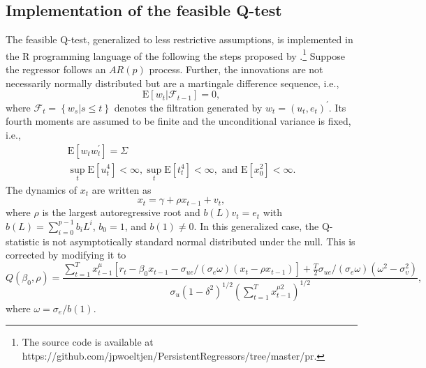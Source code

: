 \documentclass{article}
\begin{document}
\subsection{Implementation of the feasible Q-test}
\label{implementation}

The feasible Q-test, generalized to less restrictive assumptions, is implemented in the R programming language of the \citet{R} following the steps proposed by \citet{campbell2005implementing}.\footnote{The source code is available at https://github.com/jpwoeltjen/PersistentRegressors/tree/master/pr.} Suppose the regressor follows an $AR(p)$ process. Further, the innovations are not necessarily normally distributed but are a martingale difference sequence, i.e., 
\begin{equation}
\mathrm{E}\left[w_{t} |\mathscr{F}_{t-1}\right]=0,
\end{equation}
where $\mathscr{F}_{t}=\left\{w_{s} | s \leq t\right\}$ denotes the filtration generated by $w_{t}=\left(u_{t}, e_{t}\right)^{\prime}$.
Its fourth moments are assumed to be finite and the unconditional variance is fixed, i.e.,
\begin{equation}
\label{eqn:covarst}
\begin{array}{l}{\mathrm{E}\left[w_{t} w_{t}^{\prime}\right]=\Sigma} \\ {\sup _{t} \mathrm{E}\left[u_{t}^{4}\right]<\infty, \sup _{t} \mathrm{E}\left[t_{t}^{4}\right]<\infty, \text { and } \mathrm{E}\left[x_{0}^{2}\right]<\infty.}\end{array}
\end{equation}
The dynamics of $x_{t}$ are written as
\begin{equation}
\label{eqn:22}
x_{t}=\gamma+\rho x_{t-1}+v_{t},
\end{equation}
where $\rho$ is the largest autoregressive root and $b(L) v_{t}=e_{t}$ with $b(L)=\sum_{i=0}^{p-1} b_{i} L^{i}$, $b_{0}=1$, and $b(1) \neq 0$. In this generalized case, the Q-statistic is not asymptotically standard normal distributed under the null. This is corrected by modifying it to
\begin{equation}
Q\left(\beta_{0}, \rho\right)=\frac{\sum_{t=1}^{T} x_{t-1}^{\mu}\left[r_{t}-\beta_{0} x_{t-1}-\sigma_{u e} /\left(\sigma_{e} \omega\right)\left(x_{t}-\rho x_{t-1}\right)\right]+\frac{T}{2} \sigma_{u e} /\left(\sigma_{e} \omega\right)\left(\omega^{2}-\sigma_{v}^{2}\right)}{\sigma_{u}\left(1-\delta^{2}\right)^{1 / 2}\left(\sum_{t=1}^{T} x_{t-1}^{\mu 2}\right)^{1 / 2}},
\end{equation}
where $\omega=\sigma_{e} / b(1)$.
\end{document}
